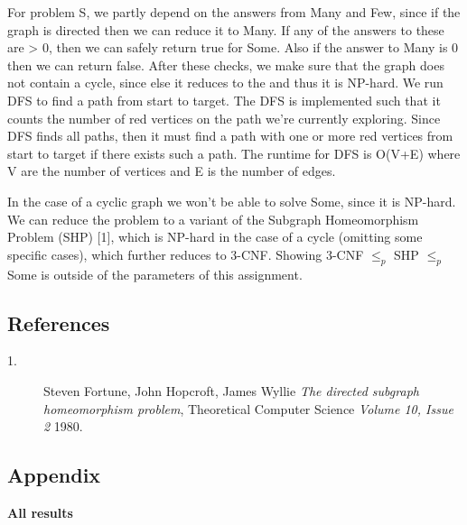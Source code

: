 \documentclass{tufte-handout}
\begin{document}
For problem S, we partly depend on the answers from Many and Few, since if the graph is directed then we can reduce it to Many. If any of the answers to these are > 0, then we can safely return true for Some. Also if the answer to Many is 0 then we can return false. After these checks, we make sure that the
graph does not contain a cycle, since else it reduces to the  and thus it is NP-hard. We run DFS to find a path from start to target. The DFS is implemented such that it counts the number of red vertices on the path we're currently exploring. Since DFS finds all paths, then it must find a path with one or more red vertices from start to target if there exists such a path. 
The runtime for DFS is O(V+E) where V are the number of vertices and E is the number of edges. 

In the case of a cyclic graph we won't be able to solve Some, since it is NP-hard. We can reduce the problem to a variant of the Subgraph Homeomorphism Problem (SHP) [1], which is NP-hard in the case of a cycle (omitting some specific cases), which further reduces to 3-CNF. Showing 3-CNF $\leq_p$ SHP $\leq_p$ Some is outside of the parameters of this assignment.

\subsection{References}
\begin{description}
  \item[1.] Steven Fortune, John Hopcroft, James Wyllie \emph{The directed subgraph homeomorphism problem}, Theoretical Computer Science \textit{Volume 10, Issue 2} 1980. 
\end{description}



\subsection{Appendix}
\textbf{All results}

\end{document}
